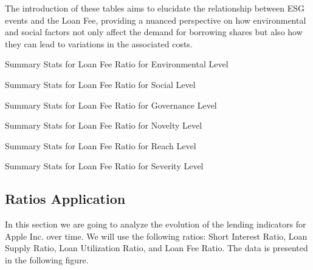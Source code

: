The introduction of these tables aims to elucidate the relationship between ESG events and the Loan Fee, providing a nuanced perspective on how environmental and social factors not only affect the demand for borrowing shares but also how they can lead to variations in the associated costs.

\begin{table}[H]
\caption{Summary Stats for Loan Fee Ratio for Environmental Level}
\centering

\label{table:loan_fee_environment.tex}
\end{table}

\begin{table}[H]
\caption{Summary Stats for Loan Fee Ratio for Social Level}
\centering

\label{table:loan_fee_social.tex}
\end{table}

\begin{table}[H]
\caption{Summary Stats for Loan Fee Ratio for Governance Level}
\centering

\label{table:loan_fee_governance.tex}
\end{table}


\begin{table}[H]
\caption{Summary Stats for Loan Fee Ratio for Novelty Level}
\centering

\label{table:loan_fee_novelty.tex}
\end{table}

\begin{table}[H]
\caption{Summary Stats for Loan Fee Ratio for Reach Level}
\centering

\label{table:loan_fee_reach.tex}
\end{table}

\begin{table}[H]
\caption{Summary Stats for Loan Fee Ratio for Severity Level}
\centering

\label{table:loan_fee_severity.tex}
\end{table}




\subsection{Ratios Application}

In this section we are going to analyze the evolution of the lending indicators for Apple Inc. over time. We will use the following ratios: Short Interest Ratio, Loan Supply Ratio, Loan Utilization Ratio, and Loan Fee Ratio. The data is presented in the following figure.

